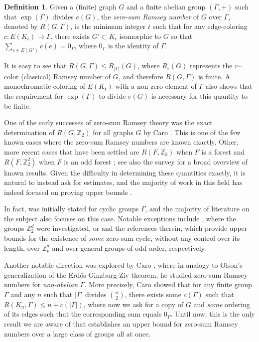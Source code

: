\documentclass{article}
\theoremstyle{definition}
\newtheorem{defn}[theorem]{Definition}
\begin{document}
\begin{defn}\label{def:zero_sum}
    Given a (finite) graph $G$ and a finite abelian group $(\Gamma, +)$ such that $\exp(\Gamma)$ divides $e(G)$, the \emph{zero-sum Ramsey number} of $G$ over $\Gamma$, denoted by $R(G, \Gamma)$,  is the minimum integer $t$ such that for any edge-coloring $c:E(K_t)\rightarrow \Gamma$, there exists $G'\subset K_t$ isomorphic to $G$ so that $\sum_{e\in E(G')} c(e)=0_\Gamma$, where $0_\Gamma$ is the identity of $\Gamma$.
\end{defn}
It is easy to see that $R(G, \Gamma)\leq R_{|\Gamma|}(G)$, where $R_r(G)$ represents the $r$--color (classical) Ramsey number of $G$, and therefore $R(G, \Gamma)$ is finite. A monochromatic coloring of $E(K_t)$ with a non-zero element of $\Gamma$ also shows that the requirement for $\exp(\Gamma)$ to divide $e(G)$ is necessary for this quantity to be finite. 

One of the early successes of zero-sum Ramsey theory was the exact determination of $R(G, \mathbb{Z}_2)$ for all graphs $G$ by Caro \cite{Caro94}. This is one of the few known cases where the zero-sum Ramsey numbers are known exactly. Other, more recent cases that have been settled are $R(F, \mathbb{Z}_3)$ when $F$ is a forest  \cite{ADP25} and $R(F, \mathbb{Z}_2^2)$ when $F$ is an odd forest \cite{ACPS22}; see also the survey \cite{Carosurvey} for a broad overview of known results. Given the difficulty in determining these quantities exactly, it is natural to instead ask for estimates, and the majority of work in this field has indeed focused on proving upper bounds \cite{AC93,CD25,Caro92}.

In fact,  was initially stated for cyclic groups $\Gamma$, and the majority of literature on the subject also focuses on this case. Notable exceptions include \cite{ACPS22}, where the groups $\mathbb{Z}_2^d$ were investigated, or \cite{CKMS25, CGHS25} and the references therein, which provide upper bounds for the existence of \emph{some} zero-sum cycle, without any control over its length, over $\mathbb{Z}_p^d$ and over general groups of odd order, respectively.

Another notable direction was explored by Caro \cite{Caro92allgroups}, where in analogy to Olson's generalization of the Erd\H{o}s-Ginzburg-Ziv theorem, he studied zero-sum Ramsey numbers for \emph{non-abelian} $\Gamma$. More precisely, Caro showed that for any finite group $\Gamma$ and any $n$ such that $|\Gamma|$ divides $\binom{n}{2}$, there exists some $c(\Gamma)$ such that $R(K_n, \Gamma) \le n +c(|\Gamma|)$, where now we ask for a copy of $G$ and \emph{some} ordering of its edges such that the corresponding sum equals $0_\Gamma$. Until now, this is the only result we are aware of that establishes an upper bound for zero-sum Ramsey numbers over a large class of groups all at once.
\end{document}
